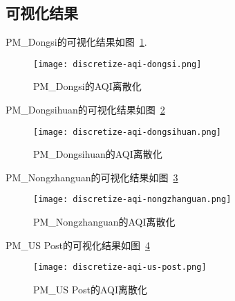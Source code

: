 \subsection{可视化结果}
PM\_Dongsi的可视化结果如图~\ref{fig:PMDongsi的AQI离散化}.

\begin{figure}[ht!]
    \centering
    \texttt{[image: discretize-aqi-dongsi.png]}
    \caption{PM\_Dongsi的AQI离散化}
    \label{fig:PMDongsi的AQI离散化}
\end{figure}

PM\_Dongsihuan的可视化结果如图~\ref{fig:PMDongsihuan的AQI离散化}

\begin{figure}[ht!]
    \texttt{[image: discretize-aqi-dongsihuan.png]}
    \centering
    \caption{PM\_Dongsihuan的AQI离散化}
    \label{fig:PMDongsihuan的AQI离散化}
\end{figure}

PM\_Nongzhanguan的可视化结果如图~\ref{fig:PMNongzhanguan的AQI离散化}
\begin{figure}[ht!]
    \texttt{[image: discretize-aqi-nongzhanguan.png]}
    \centering
    \caption{PM\_Nongzhanguan的AQI离散化}
    \label{fig:PMNongzhanguan的AQI离散化}
\end{figure}

PM\_US Post的可视化结果如图~\ref{fig:PMUS Post的AQI离散化}
\begin{figure}[ht!]
    \texttt{[image: discretize-aqi-us-post.png]}
    \centering
    \caption{PM\_US Post的AQI离散化}
    \label{fig:PMUS Post的AQI离散化}
\end{figure}
